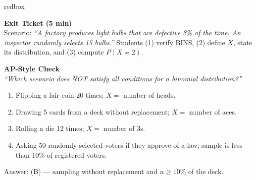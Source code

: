 \documentclass[10pt]{article}
\begin{document}
\begin{skillbox}{redbox}
\begin{minipage}[t]{0.48\linewidth}
    \textbf{Exit Ticket (5 min)}\\
    Scenario: \textit{``A factory produces light bulbs that are defective 8\% of the
    time. An inspector randomly selects 15 bulbs.''} Students (1) verify BINS, (2)
    define $X$, state its distribution, and (3) compute $P(X = 2)$.
\end{minipage}
\hfill
\begin{minipage}[t]{0.48\linewidth}
    \textbf{AP-Style Check}\\
    \textit{``Which scenario does NOT satisfy all conditions for a binomial
    distribution?''}
    \begin{enumerate}[label=(\Alph*)]
        \item Flipping a fair coin 20 times; $X =$ number of heads.
        \item Drawing 5 cards from a deck without replacement; $X =$ number of aces.
        \item Rolling a die 12 times; $X =$ number of 3s.
        \item Asking 50 randomly selected voters if they approve of a law; sample
              is less than 10\% of registered voters.
    \end{enumerate}
    Answer: (B) --- sampling without replacement and $n \ge 10\%$ of the deck.
\end{minipage}
\end{skillbox}
\end{document}
